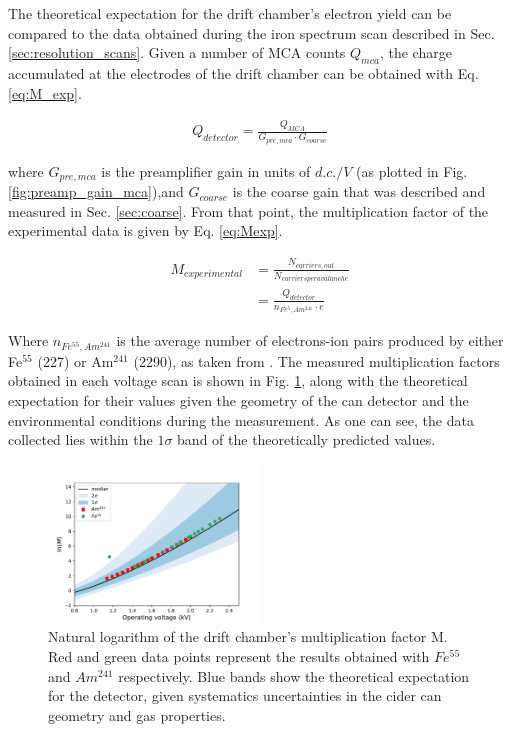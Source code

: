 The theoretical expectation for the drift chamber's electron yield can be compared to the data obtained during the iron spectrum scan described in Sec. \ref{sec:resolution_scans}. Given a number of MCA counts $Q_{mca}$, the charge accumulated at the electrodes of the drift chamber can be obtained with Eq. \ref{eq:M_exp}.

\begin{align}
  \label{eq:M_exp}
  Q_{detector} = \frac{Q_{MCA}}{G_{pre,mca}\cdot{G_{coarse}}}
\end{align}

where $G_{pre,mca}$ is the preamplifier gain in units of $d.c./V$ (as plotted in Fig. \ref{fig:preamp_gain_mca}),and $G_{coarse}$ is the coarse gain that was described and measured in Sec. \ref{sec:coarse}. From that point, the multiplication factor of the experimental data is given by Eq. \ref{eq:Mexp}.

\begin{align}
  \label{eq:Mexp}
  M_{experimental} &= \frac{N_{carriers,out}}{N_{carriers per avalanche}} \nonumber \\
                   &= \frac{Q_{detector}}{n_{Fe^{5},Am^{241}}\cdot e}
\end{align}

Where $n_{Fe^{55},Am^{241}}$ is the average number of electrons-ion pairs produced by either Fe$^{55}$ (227) or Am$^{241}$ (2290), as taken from \cite{can_paper}. The measured multiplication factors obtained in each voltage scan is shown in Fig. \ref{final_lnm}, along with the theoretical expectation for their values given the geometry of the can detector and the environmental conditions during the measurement. As one can see, the data collected lies within the $1\sigma$ band of the theoretically predicted values.

\begin{figure}[htb]
  \includegraphics[width=0.5\textwidth]{graphics/lnM_final_plot.pdf}
  \caption{Natural logarithm of the drift chamber's multiplication factor M. Red and green data points represent the results obtained with $Fe^{55}$ and $Am^{241}$ respectively. Blue bands show the theoretical expectation for the detector, given systematics uncertainties in the cider can geometry and gas properties.}
  \label{final_lnm}
\end{figure}
